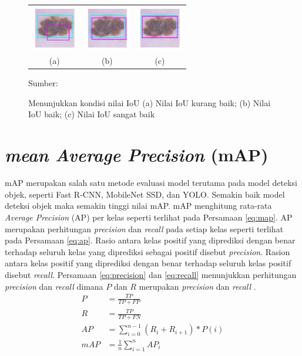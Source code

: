 \begin{figure}[H]
    \centering
    \begin{tabular}{ccc}
        \includegraphics[width=2cm]{../img/IoU Poor - Latex.PNG}
        &
        \includegraphics[width=2cm]{../img/IoU Good - Latex.PNG}
        &
        \includegraphics[width=2cm]{../img/IoU Excellent - Latex.PNG}\\
        (a) &(b) &(c)\\
    \end{tabular}
    \caption{Menunjukkan kondisi nilai IoU (a) Nilai IoU kurang baik; (b) Nilai IoU baik; (c) Nilai IoU sangat baik}
    \label{fig:iou-cat}
    Sumber: \citep{Cowton2019}
\end{figure}

\section{\textit{mean Average Precision} (mAP)}
mAP merupakan salah satu metode evaluasi model terutama pada model deteksi objek, seperti Fast R-CNN, MobileNet SSD, dan YOLO. Semakin baik model deteksi objek maka semakin tinggi nilai mAP. mAP menghitung rata-rata \textit{Average Precision} (AP) per kelas seperti terlihat pada Persamaan \ref{eq:map}. AP merupakan perhitungan \textit{precision} dan \textit{recall} pada setiap kelas seperti terlihat pada Persamaan \ref{eq:ap}. Rasio antara kelas positif yang diprediksi dengan benar terhadap seluruh kelas yang diprediksi sebagai positif disebut \textit{precision}. Rasion antara kelas positif yang diprediksi dengan benar terhadap seluruh kelas positif disebut \textit{recall}. Persamaan \ref{eq:precision} dan \ref{eq:recall} menunjukkan perhitungan \textit{precision} dan \textit{recall} dimana $P$ dan $R$ merupakan \textit{precision} dan \textit{recall} \citep{Shultz2017}.
\begin{align}
    \label{eq:precision}
    P &= \frac{TP}{TP+FP}\\
    \label{eq:recall}
    R &= \frac{TP}{TP+FN}\\
    \label{eq:ap}
    AP &= \sum_{i=0}^{n-1} (R_i+R_{i+1})\ast P(i)\\
    \label{eq:map}
    mAP &= \frac{1}{n}\sum_{i=1}^{n} AP_i
\end{align}

